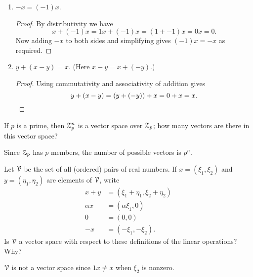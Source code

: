 \begin{enumerate}
\begin{proof}
    which implies
    \begin{equation*}
      1x = x = 0,
    \end{equation*}
    completing the proof.
  \end{proof}
\item $-x = (-1)x$.
  \begin{proof}
    By distributivity we have
    \begin{equation*}
      x + (-1)x = 1x + (-1)x = (1 + -1)x = 0x = 0.
    \end{equation*}
    Now adding $-x$ to both sides and simplifying gives $(-1)x = -x$
    as required.
  \end{proof}
\item $y + (x - y) = x$. (Here $x - y = x + (-y)$.)
  \begin{proof}
    Using commutativity and associativity of addition gives
    \begin{equation*}
      y + (x - y) = (y + (-y)) + x = 0 + x = x.\qedhere
    \end{equation*}
  \end{proof}
\end{enumerate}

 If $p$ is a prime, then $\mathcal{Z}_p^n$ is a vector space over
$\mathcal{Z}_p$; how many vectors are there in this vector space?
\begin{solution}
  Since $\mathcal{Z}_p$ has $p$ members, the number of possible vectors is
  $p^n$.
\end{solution}

 Let $\mathcal{V}$ be the set of all (ordered) pairs of real
numbers. If $x = (\xi_1,\xi_2)$ and $y = (\eta_1,\eta_2)$ are elements
of $\mathcal{V}$, write
\begin{align*}
  x + y &= (\xi_1 + \eta_1, \xi_2 + \eta_2) \\
  \alpha x &= (\alpha\xi_1, 0) \\
  0 &= (0, 0) \\
  -x &= (-\xi_1, -\xi_2).
\end{align*}
Is $\mathcal{V}$ a vector space with respect to these definitions of the linear
operations? Why?
\begin{solution}
  $\mathcal{V}$ is not a vector space since $1x \neq x$ when $\xi_2$ is
  nonzero.
\end{solution}
